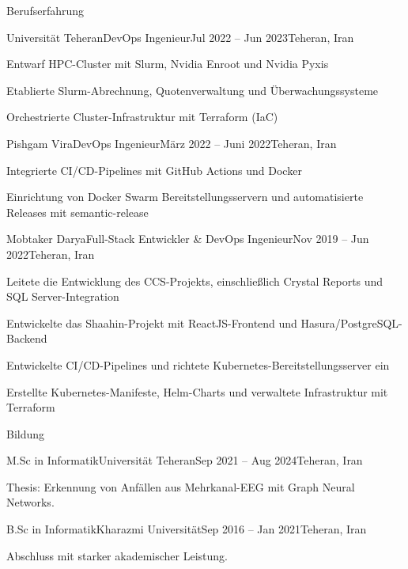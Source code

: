 \documentclass[]{main}
\begin{document}
\begin{section}{Berufserfahrung}
 \begin{subsection}{Universität Teheran}{DevOps Ingenieur}{Jul 2022 -- Jun 2023}{Teheran, Iran}
     \item Entwarf HPC-Cluster mit Slurm, Nvidia Enroot und Nvidia Pyxis
     \item Etablierte Slurm-Abrechnung, Quotenverwaltung und Überwachungssysteme
     \item Orchestrierte Cluster-Infrastruktur mit Terraform (IaC)
 \end{subsection}

 \begin{subsection}{Pishgam Vira}{DevOps Ingenieur}{März 2022 -- Juni 2022}{Teheran, Iran}
     \item Integrierte CI/CD-Pipelines mit GitHub Actions und Docker
     \item Einrichtung von Docker Swarm Bereitstellungsservern und automatisierte Releases mit semantic-release
 \end{subsection}

 \begin{subsection}{Mobtaker Darya}{Full-Stack Entwickler \& DevOps Ingenieur}{Nov 2019 -- Jun 2022}{Teheran, Iran}
     \item Leitete die Entwicklung des CCS-Projekts, einschließlich Crystal Reports und SQL Server-Integration
     \item Entwickelte das Shaahin-Projekt mit ReactJS-Frontend und Hasura/PostgreSQL-Backend
     \item Entwickelte CI/CD-Pipelines und richtete Kubernetes-Bereitstellungsserver ein
     \item Erstellte Kubernetes-Manifeste, Helm-Charts und verwaltete Infrastruktur mit Terraform
 \end{subsection}
\end{section}

\newpage

\begin{section}{Bildung}
 \begin{subsectionnobullet}{M.Sc in Informatik}{Universität Teheran}{Sep 2021 -- Aug 2024}{Teheran, Iran}
     \item Thesis: Erkennung von Anfällen aus Mehrkanal-EEG mit Graph Neural Networks.
 \end{subsectionnobullet}
 \begin{subsectionnobullet}{B.Sc in Informatik}{Kharazmi Universität}{Sep 2016 -- Jan 2021}{Teheran, Iran}
     \item Abschluss mit starker akademischer Leistung.
 \end{subsectionnobullet}
\end{section}
\end{document}
